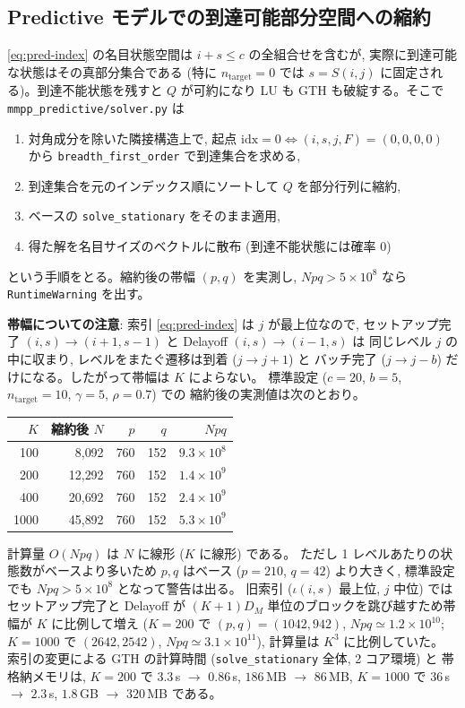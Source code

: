 \documentclass[a4paper,11pt]{article}
\newcommand{\code}[1]{\texttt{#1}}
\begin{document}
\subsection{Predictive モデルでの到達可能部分空間への縮約}

\eqref{eq:pred-index} の名目状態空間は $i+s\le c$ の全組合せを含むが,
実際に到達可能な状態はその真部分集合である (特に $n_{\mathrm{target}}=0$ では
$s=S(i,j)$ に固定される)。到達不能状態を残すと $Q$ が可約になり
LU も GTH も破綻する。そこで \code{mmpp\_predictive/solver.py} は
\begin{enumerate}
  \item 対角成分を除いた隣接構造上で, 起点
        $\mathrm{idx}=0 \Leftrightarrow (i,s,j,F)=(0,0,0,0)$ から
        \code{breadth\_first\_order} で到達集合を求める,
  \item 到達集合を元のインデックス順にソートして $Q$ を部分行列に縮約,
  \item ベースの \code{solve\_stationary} をそのまま適用,
  \item 得た解を名目サイズのベクトルに散布 (到達不能状態には確率 $0$)
\end{enumerate}
という手順をとる。縮約後の帯幅 $(p,q)$ を実測し,
$N p q > 5\times10^8$ なら \code{RuntimeWarning} を出す。

\textbf{帯幅についての注意}: 索引 \eqref{eq:pred-index} は $j$ が最上位なので,
セットアップ完了 $(i,s)\to(i+1,s-1)$ と Delayoff $(i,s)\to(i-1,s)$ は
同じレベル $j$ の中に収まり, レベルをまたぐ遷移は到着 ($j\to j+1$) と
バッチ完了 ($j\to j-b$) だけになる。したがって帯幅は $K$ によらない。
標準設定 ($c=20$, $b=5$, $n_{\mathrm{target}}=10$, $\gamma=5$, $\rho=0.7$) での
縮約後の実測値は次のとおり。
\begin{center}
\begin{tabular}{rrrrr}
\toprule
$K$ & 縮約後 $N$ & $p$ & $q$ & $Npq$ \\
\midrule
100  & 8{,}092  & 760 & 152 & $9.3\times10^{8}$ \\
200  & 12{,}292 & 760 & 152 & $1.4\times10^{9}$ \\
400  & 20{,}692 & 760 & 152 & $2.4\times10^{9}$ \\
1000 & 45{,}892 & 760 & 152 & $5.3\times10^{9}$ \\
\bottomrule
\end{tabular}
\end{center}
計算量 $O(Npq)$ は $N$ に線形 ($K$ に線形) である。
ただし 1 レベルあたりの状態数がベースより多いため $p,q$ はベース
($p=210$, $q=42$) より大きく, 標準設定でも $Npq>5\times10^8$ となって警告は出る。
旧索引 ($\iota(i,s)$ 最上位, $j$ 中位) ではセットアップ完了と Delayoff が
$(K+1)D_M$ 単位のブロックを跳び越すため帯幅が $K$ に比例して増え
($K=200$ で $(p,q)=(1042,942)$, $Npq\simeq1.2\times10^{10}$;
$K=1000$ で $(2642,2542)$, $Npq\simeq3.1\times10^{11}$),
計算量は $K^3$ に比例していた。
索引の変更による GTH の計算時間 (\code{solve\_stationary} 全体, 2 コア環境) と
帯格納メモリは, $K=200$ で $3.3$\,s $\to$ $0.86$\,s, $186$\,MB $\to$ $86$\,MB,
$K=1000$ で $36$\,s $\to$ $2.3$\,s, $1.8$\,GB $\to$ $320$\,MB である。
\end{document}
